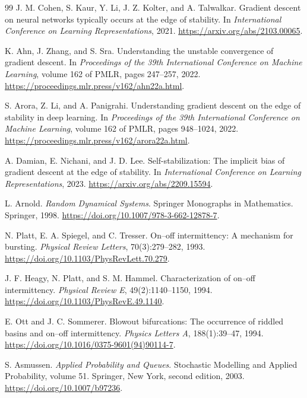 \documentclass[11pt]{article}
\theoremstyle{definition}
\begin{document}
\begin{thebibliography}{99}
J. M. Cohen, S. Kaur, Y. Li, J. Z. Kolter, and A. Talwalkar.
\newblock Gradient descent on neural networks typically occurs at the edge
of stability.
\newblock In \emph{International Conference on Learning Representations},
2021.
\newblock \url{https://arxiv.org/abs/2103.00065}.

K. Ahn, J. Zhang, and S. Sra.
\newblock Understanding the unstable convergence of gradient descent.
\newblock In \emph{Proceedings of the 39th International Conference on
Machine Learning}, volume 162 of PMLR, pages 247--257, 2022.
\newblock \url{https://proceedings.mlr.press/v162/ahn22a.html}.

S. Arora, Z. Li, and A. Panigrahi.
\newblock Understanding gradient descent on the edge of stability in deep
learning.
\newblock In \emph{Proceedings of the 39th International Conference on
Machine Learning}, volume 162 of PMLR, pages 948--1024, 2022.
\newblock \url{https://proceedings.mlr.press/v162/arora22a.html}.

A. Damian, E. Nichani, and J. D. Lee.
\newblock Self-stabilization: The implicit bias of gradient descent at the
edge of stability.
\newblock In \emph{International Conference on Learning Representations},
2023.
\newblock \url{https://arxiv.org/abs/2209.15594}.

L. Arnold.
\newblock \emph{Random Dynamical Systems}.
\newblock Springer Monographs in Mathematics. Springer, 1998.
\newblock \url{https://doi.org/10.1007/978-3-662-12878-7}.

N. Platt, E. A. Spiegel, and C. Tresser.
\newblock On--off intermittency: A mechanism for bursting.
\newblock \emph{Physical Review Letters}, 70(3):279--282, 1993.
\newblock \url{https://doi.org/10.1103/PhysRevLett.70.279}.

J. F. Heagy, N. Platt, and S. M. Hammel.
\newblock Characterization of on--off intermittency.
\newblock \emph{Physical Review E}, 49(2):1140--1150, 1994.
\newblock \url{https://doi.org/10.1103/PhysRevE.49.1140}.

E. Ott and J. C. Sommerer.
\newblock Blowout bifurcations: The occurrence of riddled basins and
on--off intermittency.
\newblock \emph{Physics Letters A}, 188(1):39--47, 1994.
\newblock \url{https://doi.org/10.1016/0375-9601(94)90114-7}.

S. Asmussen.
\newblock \emph{Applied Probability and Queues}.
\newblock Stochastic Modelling and Applied Probability, volume 51.
Springer, New York, second edition, 2003.
\newblock \url{https://doi.org/10.1007/b97236}.


\end{thebibliography}
\end{document}
